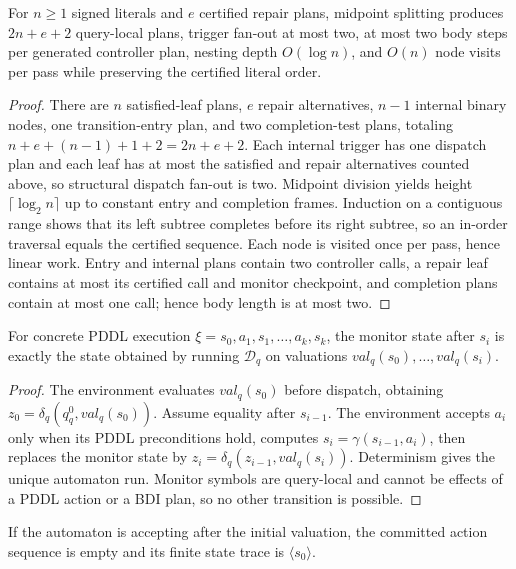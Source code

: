 \begin{proposition}
For $n\geq1$ signed literals and $e$ certified repair plans, midpoint splitting
produces $2n+e+2$ query-local plans, trigger fan-out at most two, at most two
body steps per generated controller plan, nesting depth $O(\log n)$, and
$O(n)$ node visits per pass while preserving the certified literal order.
\end{proposition}

\begin{proof}
There are $n$ satisfied-leaf plans, $e$ repair alternatives, $n-1$ internal
binary nodes, one transition-entry plan, and two completion-test plans, totaling
$n+e+(n-1)+1+2=2n+e+2$. Each internal trigger has one dispatch plan and each leaf
has at most the satisfied and repair alternatives counted above, so structural
dispatch fan-out is two. Midpoint division yields height
$\lceil\log_2 n\rceil$ up to constant entry and completion frames. Induction on
a contiguous range shows that its left subtree completes before its right
subtree, so an in-order traversal equals the certified sequence. Each node is
visited once per pass, hence linear work. Entry and internal plans contain two
controller calls, a repair leaf contains at most its certified call and monitor
checkpoint, and completion plans contain at most one call; hence body length is
at most two.
\end{proof}

\begin{proposition}
For concrete PDDL execution
$\xi=s_0,a_1,s_1,\ldots,a_k,s_k$, the monitor state after $s_i$ is exactly the state
obtained by running $\mathcal D_q$ on valuations
$\mathit{val}_q(s_0),\ldots,\mathit{val}_q(s_i)$.
\end{proposition}

\begin{proof}
The environment evaluates $\mathit{val}_q(s_0)$ before dispatch, obtaining
$z_0=\delta_q(q_q^0,\mathit{val}_q(s_0))$. Assume equality
after $s_{i-1}$. The environment accepts $a_i$ only when its PDDL preconditions
hold, computes $s_i=\gamma(s_{i-1},a_i)$, then replaces the monitor state by
$z_i=\delta_q(z_{i-1},\mathit{val}_q(s_i))$. Determinism gives the unique
automaton run.
Monitor symbols are query-local and cannot be effects of a PDDL action or a BDI
plan, so no other transition is possible.
\end{proof}

\begin{proposition}
If the automaton is accepting after the initial valuation, the committed action
sequence is empty and its finite state trace is $\langle s_0\rangle$.
\end{proposition}

